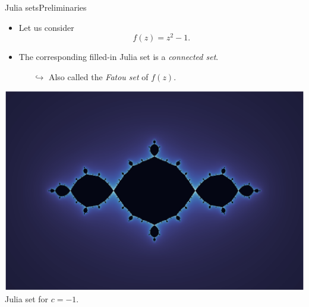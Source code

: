 \documentclass[usenames,dvipsnames,svgnames,10pt,aspectratio=169]{beamer}
\begin{document}
\begin{frame}[t, c]{Julia sets}{Preliminaries}
	\begin{minipage}{.48\textwidth}
		\begin{itemize}
			\item Let us consider
			$$f(z) = z^2 - 1.$$

			\medskip

			\item The corresponding filled-in Julia set is a \emph{connected set}.
			\begin{itemize}
				\item[$\hookrightarrow$] Also called the \emph{Fatou set} of $f(z)$.
			\end{itemize}
		\end{itemize}
	\end{minipage}%
	\hfill
	\begin{minipage}{.48\textwidth}
		\centering
		\includegraphics[width=\columnwidth]{Julia_set_1} \\
		\medskip
		Julia set for $c = -1$.
	\end{minipage}

	\vspace{1cm}
\end{frame}
\end{document}
